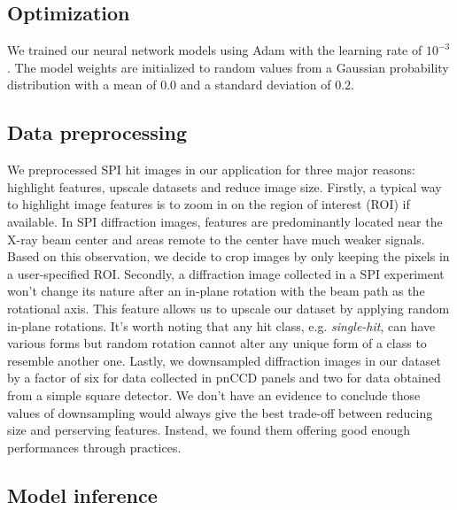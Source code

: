 \subsection{Optimization}


We trained our neural network models using Adam
\cite{kingmaAdamMethodStochastic2017} with the learning rate of $10^{-3}$.  The
model weights are initialized to random values from a Gaussian probability
distribution with a mean of $0.0$ and a standard deviation of $0.2$.  

\subsection{Data preprocessing}

We preprocessed SPI hit images in our application for three major reasons:
highlight features, upscale datasets and reduce image size.  Firstly, a typical
way to highlight image features is to zoom in on the region of interest (ROI) if
available.  In SPI diffraction images, features are predominantly located near
the X-ray beam center and areas remote to the center have much weaker signals.
Based on this observation, we decide to crop images by only keeping the pixels
in a user-specified ROI.  Secondly, a diffraction image collected in a SPI
experiment won't change its nature after an in-plane rotation with the beam path
as the rotational axis.  This feature allows us to upscale our dataset by
applying random in-plane rotations.  It's worth noting that any hit class, e.g.
\textit{single-hit}, can have various forms but random rotation cannot alter any
unique form of a class to resemble another one.  Lastly, we downsampled
diffraction images in our dataset by a factor of six for data collected in pnCCD
panels and two for data obtained from a simple square detector.  We don't have
an evidence to conclude those values of downsampling would always give the best
trade-off between reducing size and perserving features.  Instead, we found them
offering good enough performances through practices.  


\subsection{Model inference}

